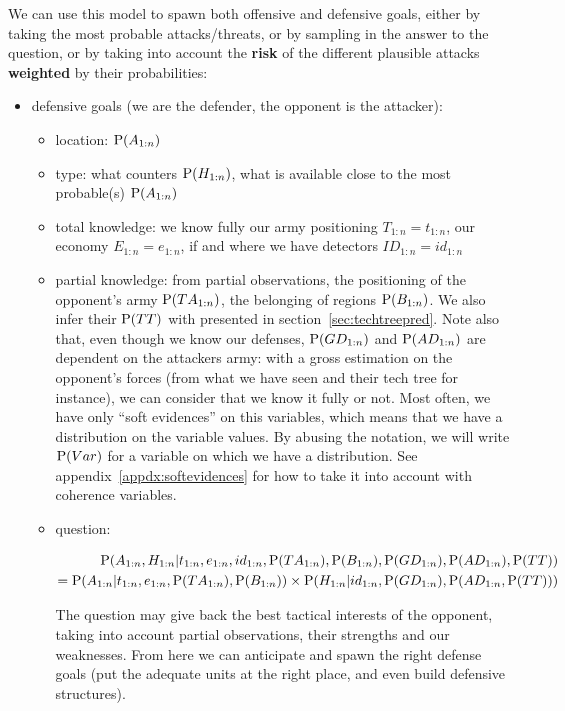 We can use this model to spawn both offensive and defensive goals, either by taking the most probable attacks/threats, or by sampling in the answer to the question, or by taking into account the \textbf{risk} of the different plausible attacks \textbf{weighted} by their probabilities:
\begin{itemize}
    \item defensive goals (we are the defender, the opponent is the attacker):
    \begin{itemize}
        \item location: $\mathrm{P}(A_{1:n})$
        \item type: what counters $\mathrm{P}(H_{1:n})$, what is available close to the most probable(s) $\mathrm{P}(A_{1:n})$
        \item total knowledge: we know fully our army positioning $T_{1:n}=t_{1:n}$, our economy $E_{1:n}=e_{1:n}$, if and where we have detectors $ID_{1:n}=id_{1:n}$
        \item partial knowledge: from partial observations, the positioning of the opponent's army $\mathrm{P}(TA_{1:n})$, the belonging of regions $\mathrm{P}(B_{1:n})$. We also infer their  $\mathrm{P}(TT)$ with \citep{SYNNAEVE:StratPred} presented in section~\ref{sec:techtreepred}. Note also that, even though we know our defenses, $\mathrm{P}(GD_{1:n})$ and $\mathrm{P}(AD_{1:n})$ are dependent on the attackers army: with a gross estimation on the opponent's forces (from what we have seen and their tech tree for instance), we can consider that we know it fully or not. Most often, we have only ``soft evidences'' on this variables, which means that we have a distribution on the variable values. By abusing the notation, we will write $\mathrm{P}(Var)$ for a variable on which we have a distribution. See appendix~\ref{appdx:softevidences} for how to take it into account with coherence variables.
        \item question:
\begin{small}
\begin{eqnarray*}
\mathrm{P}(A_{1:n},H_{1:n}|t_{1:n},e_{1:n},id_{1:n},\mathrm{P}(TA_{1:n}),\mathrm{P}(B_{1:n}),\mathrm{P}(GD_{1:n}),\mathrm{P}(AD_{1:n}),\mathrm{P}(TT))\\
= \mathrm{P}(A_{1:n}|t_{1:n},e_{1:n},\mathrm{P}(TA_{1:n}),\mathrm{P}(B_{1:n}))\times \mathrm{P}(H_{1:n}|id_{1:n},\mathrm{P}(GD_{1:n}),\mathrm{P}(AD_{1:n},\mathrm{P}(TT)))
\end{eqnarray*}
\end{small}
The question may give back the best tactical interests of the opponent, taking into account partial observations, their strengths and our weaknesses. From here we can anticipate and spawn the right defense goals (put the adequate units at the right place, and even build defensive structures). 
    \end{itemize}


\end{itemize}
